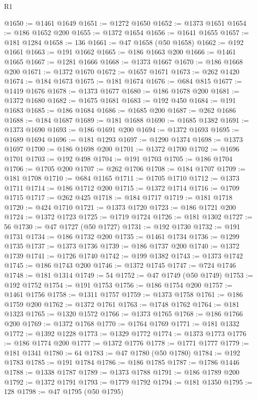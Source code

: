 \begin{lexlean}{R1}
\begin{coremodule}
@1650 := @1461 @1649
@1651 := @1272 @1650
@1652 := @1373 @1651
@1654 := @186 @1652 @200
@1655 := @1372 @1654
@1656 := @1641 @1655
@1657 := @181 @1284
@1658 := 136
@1661 := @47 @1658 (@50 @1658)
@1662 := @192 @1661
@1663 := @191 @1662
@1665 := @186 @1663 @200
@1666 := @1461 @1665
@1667 := @1281 @1666
@1668 := @1373 @1667
@1670 := @186 @1668 @200
@1671 := @1372 @1670
@1672 := @1657 @1671
@1673 := @262 @1420
@1674 := @184 @1673
@1675 := @181 @1674
@1676 := @684 @815
@1677 := @1419 @1676
@1678 := @1373 @1677
@1680 := @186 @1678 @200
@1681 := @1372 @1680
@1682 := @1675 @1681
@1683 := @192 @450
@1684 := @191 @1683
@1685 := @186 @1684
@1686 := @1685 @200
@1687 := @262 @1686
@1688 := @184 @1687
@1689 := @181 @1688
@1690 := @1685 @1382
@1691 := @1373 @1690
@1693 := @186 @1691 @200
@1694 := @1372 @1693
@1695 := @1689 @1694
@1696 := @181 @1293
@1697 := @1290 @1374
@1698 := @1373 @1697
@1700 := @186 @1698 @200
@1701 := @1372 @1700
@1702 := @1696 @1701
@1703 := @192 @498
@1704 := @191 @1703
@1705 := @186 @1704
@1706 := @1705 @200
@1707 := @262 @1706
@1708 := @184 @1707
@1709 := @181 @1708
@1710 := @684 @1165
@1711 := @1705 @1710
@1712 := @1373 @1711
@1714 := @186 @1712 @200
@1715 := @1372 @1714
@1716 := @1709 @1715
@1717 := @262 @425
@1718 := @184 @1717
@1719 := @181 @1718
@1720 := @424 @1710
@1721 := @1373 @1720
@1723 := @186 @1721 @200
@1724 := @1372 @1723
@1725 := @1719 @1724
@1726 := @181 @1302
@1727 := 56
@1730 := @47 @1727 (@50 @1727)
@1731 := @192 @1730
@1732 := @191 @1731
@1734 := @186 @1732 @200
@1735 := @1461 @1734
@1736 := @1299 @1735
@1737 := @1373 @1736
@1739 := @186 @1737 @200
@1740 := @1372 @1739
@1741 := @1726 @1740
@1742 := @199 @1382
@1743 := @1373 @1742
@1745 := @186 @1743 @200
@1746 := @1372 @1745
@1747 := @724 @1746
@1748 := @181 @1314
@1749 := 54
@1752 := @47 @1749 (@50 @1749)
@1753 := @192 @1752
@1754 := @191 @1753
@1756 := @186 @1754 @200
@1757 := @1461 @1756
@1758 := @1311 @1757
@1759 := @1373 @1758
@1761 := @186 @1759 @200
@1762 := @1372 @1761
@1763 := @1748 @1762
@1764 := @181 @1323
@1765 := @1320 @1572
@1766 := @1373 @1765
@1768 := @186 @1766 @200
@1769 := @1372 @1768
@1770 := @1764 @1769
@1771 := @181 @1332
@1772 := @1392 @1228
@1773 := @1329 @1772
@1774 := @1373 @1773
@1776 := @186 @1774 @200
@1777 := @1372 @1776
@1778 := @1771 @1777
@1779 := @181 @1341
@1780 := 64
@1783 := @47 @1780 (@50 @1780)
@1784 := @192 @1783
@1785 := @191 @1784
@1786 := @186 @1785
@1787 := @1786 @1446
@1788 := @1338 @1787
@1789 := @1373 @1788
@1791 := @186 @1789 @200
@1792 := @1372 @1791
@1793 := @1779 @1792
@1794 := @181 @1350
@1795 := 128
@1798 := @47 @1795 (@50 @1795)

\end{coremodule}
\end{lexlean}
